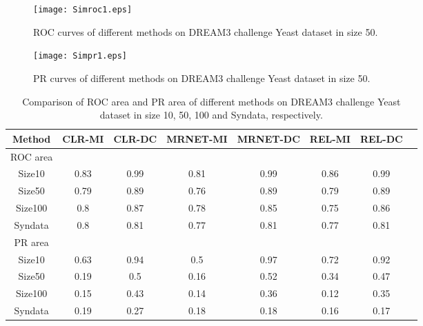 \documentclass{bioinfo}
\begin{document}
\begin{figure}
  \texttt{[image: Simroc1.eps]}
  \caption{ROC curves of different methods on DREAM3 challenge Yeast dataset in size 50.}\label{roc-curve1}
\end{figure}

\begin{figure}
  \texttt{[image: Simpr1.eps]}
  \caption{ PR curves of different methods on DREAM3 challenge Yeast dataset in size 50.}\label{pr-curve1}
\end{figure}

%


\begin{table}[0.5\textwidth] \tiny
\centering \caption{Comparison of ROC area and PR area of different methods on DREAM3 challenge Yeast dataset in size 10, 50, 100 and Syndata,
respectively.}\label{roc-pr}
\begin{tabular}{cccccccc}
 \hline
 Method & CLR-MI & CLR-DC & MRNET-MI & MRNET-DC & REL-MI & REL-DC \\
 \hline
  ROC area\\
 Size10 & 0.83 & 0.99 & 0.81 & 0.99 & 0.86 & 0.99  \\
 Size50 & 0.79 & 0.89 & 0.76 & 0.89 & 0.79 & 0.89 \\
 Size100 & 0.8 & 0.87 & 0.78 & 0.85 & 0.75 & 0.86 \\
 Syndata & 0.8 & 0.81 & 0.77 & 0.81 & 0.77 & 0.81 \\
 PR area\\
 Size10 & 0.63 & 0.94 & 0.5 & 0.97 & 0.72 & 0.92  \\
 Size50 & 0.19 & 0.5 & 0.16 & 0.52 & 0.34 & 0.47  \\
 Size100 & 0.15 & 0.43 & 0.14 & 0.36 & 0.12 & 0.35 \\
 Syndata & 0.19 & 0.27 & 0.18 & 0.18 & 0.16 & 0.17  \\
  \hline
\end{tabular}
\end{table}
\end{document}
